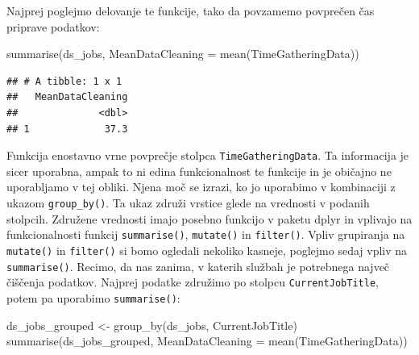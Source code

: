 \documentclass[
]{book}
\newenvironment{Shaded}{\begin{snugshade}}{\end{snugshade}}
\newcommand{\AttributeTok}[1]{\textcolor[rgb]{0.77,0.63,0.00}{#1}}
\newcommand{\FunctionTok}[1]{\textcolor[rgb]{0.00,0.00,0.00}{#1}}
\newcommand{\NormalTok}[1]{#1}
\newcommand{\OtherTok}[1]{\textcolor[rgb]{0.56,0.35,0.01}{#1}}
\begin{document}
Najprej poglejmo delovanje te funkcije, tako da povzamemo povprečen čas priprave podatkov:

\begin{Shaded}
\begin{Highlighting}[]
\FunctionTok{summarise}\NormalTok{(ds\_jobs, }\AttributeTok{MeanDataCleaning =} \FunctionTok{mean}\NormalTok{(TimeGatheringData))}
\end{Highlighting}
\end{Shaded}

\begin{verbatim}
## # A tibble: 1 x 1
##   MeanDataCleaning
##              <dbl>
## 1             37.3
\end{verbatim}

Funkcija enostavno vrne povprečje stolpca \texttt{TimeGatheringData}. Ta informacija je sicer uporabna, ampak to ni edina funkcionalnost te funkcije in je običajno ne uporabljamo v tej obliki. Njena moč se izrazi, ko jo uporabimo v kombinaciji z ukazom \texttt{group\_by()}. Ta ukaz združi vrstice glede na vrednosti v podanih stolpcih. Združene vrednosti imajo posebno funkcijo v paketu dplyr in vplivajo na funkcionalnosti funkcij \texttt{summarise()}, \texttt{mutate()} in \texttt{filter()}. Vpliv grupiranja na \texttt{mutate()} in \texttt{filter()} si bomo ogledali nekoliko kasneje, poglejmo sedaj vpliv na \texttt{summarise()}. Recimo, da nas zanima, v katerih službah je potrebnega največ čiščenja podatkov. Najprej podatke združimo po stolpcu \texttt{CurrentJobTitle}, potem pa uporabimo \texttt{summarise()}:

\begin{Shaded}
\begin{Highlighting}[]
\NormalTok{ds\_jobs\_grouped }\OtherTok{\textless{}{-}} \FunctionTok{group\_by}\NormalTok{(ds\_jobs, CurrentJobTitle)}
\FunctionTok{summarise}\NormalTok{(ds\_jobs\_grouped, }\AttributeTok{MeanDataCleaning =} \FunctionTok{mean}\NormalTok{(TimeGatheringData))}
\end{Highlighting}
\end{Shaded}
\end{document}
